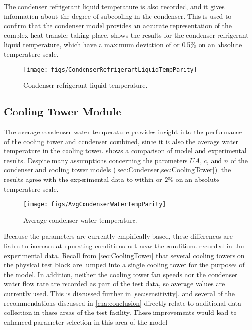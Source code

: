 The condenser refrigerant liquid temperature is also recorded,
and it gives information about the degree of subcooling in the condenser.
This is used to confirm that the condenser model provides an
accurate representation of the complex heat transfer taking place.
 shows the results for the condenser
refrigerant liquid temperature, which have a maximum deviation of
 or 0.5\% on an absolute temperature scale.
\begin{figure}[tbp]
  \centering
  \texttt{[image: figs/CondenserRefrigerantLiquidTempParity]}
  \caption{Condenser refrigerant liquid temperature.}
  \label{fig:CondRefLiqTempParity}
\end{figure}

\subsection{Cooling Tower Module}
The average condenser water temperature provides insight
into the performance of the cooling tower and condenser combined,
since it is also the average water temperature in the cooling tower.
 shows a comparison of model and
experimental results.
Despite many assumptions concerning the parameters $UA$, $c$, and $n$ of the condenser
and cooling tower models (\cref{sec:Condenser,sec:CoolingTower}),
the results agree with the experimental data to within 
or 2\% on an absolute temperature scale.
\begin{figure}[tbp]
  \centering
  \texttt{[image: figs/AvgCondenserWaterTempParity]}
  \caption{Average condenser water temperature.}
  \label{fig:AvgCondWatTempParity}
\end{figure}

Because the parameters are currently empirically-based,
these differences are liable to increase at operating conditions
not near the conditions recorded in the experimental data.
Recall from \cref{sec:CoolingTower} that several cooling towers on
the physical test block are lumped into a single cooling tower for
the purposes of the model.
In addition, neither the cooling tower fan speeds nor the condenser
water flow rate are recorded as part of the test data, so average
values are currently used.
This is discussed further in \cref{sec:sensitivity}, and
several of the recommendations discussed in \cref{cha:conclusion}
directly relate to additional data collection in these areas of the test
facility.
These improvements would lead to enhanced parameter selection
in this area of the model.

